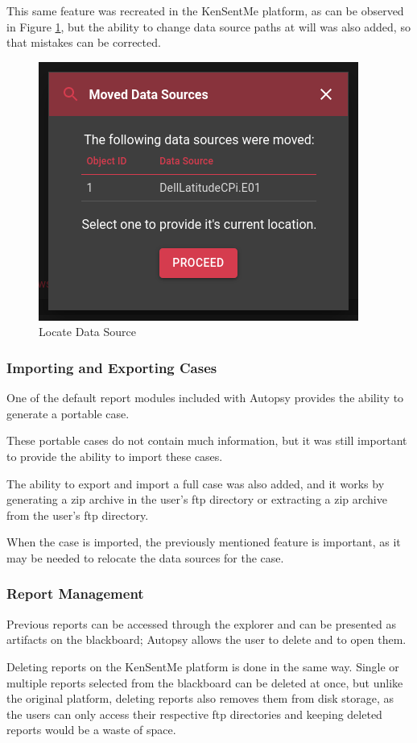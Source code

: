 This same feature was recreated in the KenSentMe platform, as can be observed in Figure \ref{fig:locate}, but the ability to change data source paths at will was also added, so that mistakes can be corrected.

\begin{figure}[ht]
 \centering
 \includegraphics[width=0.6\linewidth]{imgs/locate.png}
 \caption{Locate Data Source}
 \label{fig:locate}
\end{figure}

\subsubsection*{Importing and Exporting Cases}

One of the default report modules included with Autopsy provides the ability to generate a portable case.

These portable cases do not contain much information, but it was still important to provide the ability to import these cases.

The ability to export and import a full case was also added, and it works by generating a zip archive in the user's \acrshort{ftp} directory or extracting a zip archive from the user's \acrshort{ftp} directory.

When the case is imported, the previously mentioned feature is important, as it may be needed to relocate the data sources for the case.

\subsubsection*{Report Management}

Previous reports can be accessed through the explorer and can be presented as artifacts on the blackboard; Autopsy allows the user to delete and to open them.

Deleting reports on the KenSentMe platform is done in the same way. Single or multiple reports selected from the blackboard can be deleted at once, but unlike the original platform, deleting reports also removes them from disk storage, 
as the users can only access their respective \acrshort{ftp} directories and keeping deleted reports would be a waste of space.

